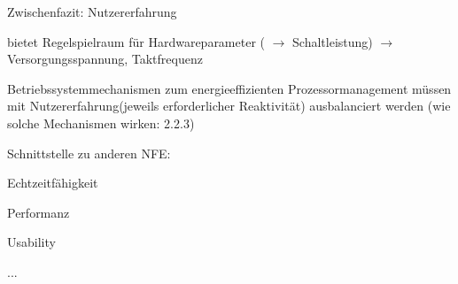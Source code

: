 \documentclass[a4paper]{article}
\begin{document}
\begin{multicols}{3}
    Zwischenfazit: Nutzererfahrung

    \begin{itemize*}
        \item
        bietet Regelspielraum für Hardwareparameter (
        $\rightarrow$  Schaltleistung)
        $\rightarrow$  Versorgungsspannung, Taktfrequenz
        \item
        Betriebssystemmechanismen zum energieeffizienten Prozessormanagement
        müssen mit Nutzererfahrung(jeweils erforderlicher Reaktivität)
        ausbalanciert werden (wie solche Mechanismen wirken: 2.2.3)
        \item
        Schnittstelle zu anderen NFE:
        \begin{itemize*}
            \item Echtzeitfähigkeit
            \item Performanz
            \item Usability
            \item ...
        \end{itemize*}
    \end{itemize*}



\end{multicols}
\end{document}
